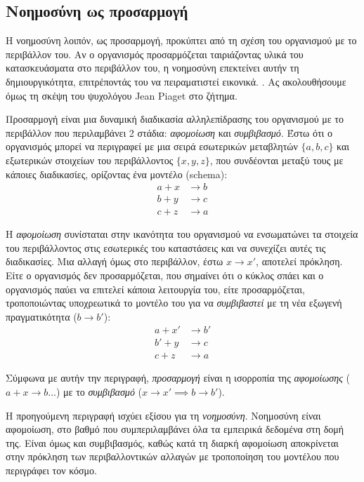 \subsection*{Νοημοσύνη ως προσαρμογή}

  Η νοημοσύνη λοιπόν, ως προσαρμογή, προκύπτει από τη σχέση του οργανισμού με το περιβάλλον του.
  Αν ο οργανισμός προσαρμόζεται ταιριάζοντας υλικά του κατασκευάσματα στο περιβάλλον του, η νοημοσύνη επεκτείνει αυτήν τη δημιουργικότητα, επιτρέποντάς του να πειραματιστεί εικονικά.
  \parencite[σελ 3]{piagetOriginsIntelligenceChildren1952}.
  Ας ακολουθήσουμε όμως τη σκέψη του ψυχολόγου Jean Piaget στο ζήτημα.

  Προσαρμογή είναι μια δυναμική διαδικασία αλληλεπίδρασης του οργανισμού με το περιβάλλον που περιλαμβάνει 2 στάδια: \textit{αφομοίωση} και \textit{συμβιβασμό}.
  Έστω ότι ο οργανισμός μπορεί να περιγραφεί με μια σειρά εσωτερικών μεταβλητών $\{a,b,c\}$ και εξωτερικών στοιχείων του περιβάλλοντος $\{x,y,z\}$,
  που συνδέονται μεταξύ τους με κάποιες διαδικασίες, ορίζοντας ένα μοντέλο (schema):
  \begin{align*}
    a + x &\rightarrow b\\
    b + y &\rightarrow c\\
    c + z &\rightarrow a
  \end{align*}

  Η \textit{αφομοίωση} συνίσταται στην ικανότητα του οργανισμού να ενσωματώνει τα στοιχεία του περιβάλλοντος στις εσωτερικές του καταστάσεις και να συνεχίζει αυτές τις διαδικασίες.
  Μια αλλαγή όμως στο περιβάλλον, έστω $x\rightarrow x'$, αποτελεί πρόκληση.
  Είτε ο οργανισμός δεν προσαρμόζεται, που σημαίνει ότι ο κύκλος σπάει και ο οργανισμός παύει να επιτελεί κάποια λειτουργία του,
  είτε προσαρμόζεται, τροποποιώντας υποχρεωτικά το μοντέλο του για να \textit{συμβιβαστεί} με τη νέα εξωγενή πραγματικότητα ($b\rightarrow b'$):
  \begin{align*}
    a  + x' &\rightarrow b'\\
    b' + y  &\rightarrow c\\
    c  + z  &\rightarrow a
  \end{align*}

  Σύμφωνα με αυτήν την περιγραφή, \textit{προσαρμογή} είναι η ισορροπία της \textit{αφομοίωσης} ($a+x\rightarrow b$...) με το \textit{συμβιβασμό} ($x\rightarrow x' \implies b\rightarrow b'$).

  Η προηγούμενη περιγραφή ισχύει εξίσου για τη \textit{νοημοσύνη}. Νοημοσύνη είναι αφομοίωση, στο βαθμό που συμπεριλαμβάνει όλα τα εμπειρικά δεδομένα στη δομή της.
  Είναι όμως και συμβιβασμός, καθώς κατά τη διαρκή αφομοίωση αποκρίνεται στην πρόκληση των περιβαλλοντικών αλλαγών με τροποποίηση του μοντέλου που περιγράφει τον κόσμο.

